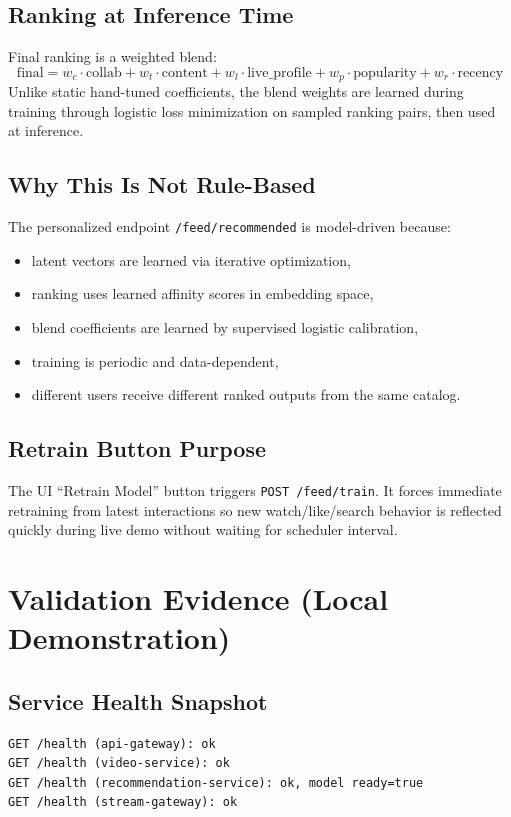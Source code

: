 \documentclass[11pt,a4paper]{article}
\begin{document}
\subsection{Ranking at Inference Time}
Final ranking is a weighted blend:
\[
\text{final} = w_c\cdot\text{collab} + w_t\cdot\text{content}
+ w_l\cdot\text{live\_profile}
+ w_p\cdot\text{popularity}
+ w_r\cdot\text{recency}
\]
Unlike static hand-tuned coefficients, the blend weights are learned during training through logistic loss minimization on sampled ranking pairs, then used at inference.

\subsection{Why This Is Not Rule-Based}
The personalized endpoint \texttt{/feed/recommended} is model-driven because:
\begin{itemize}[leftmargin=1.2em]
  \item latent vectors are learned via iterative optimization,
  \item ranking uses learned affinity scores in embedding space,
  \item blend coefficients are learned by supervised logistic calibration,
  \item training is periodic and data-dependent,
  \item different users receive different ranked outputs from the same catalog.
\end{itemize}

\subsection{Retrain Button Purpose}
The UI ``Retrain Model'' button triggers \texttt{POST /feed/train}. It forces immediate retraining from latest interactions so new watch/like/search behavior is reflected quickly during live demo without waiting for scheduler interval.

\section{Validation Evidence (Local Demonstration)}
\subsection{Service Health Snapshot}
\begin{lstlisting}[style=plain,caption={Health endpoint checks}]
GET /health (api-gateway): ok
GET /health (video-service): ok
GET /health (recommendation-service): ok, model ready=true
GET /health (stream-gateway): ok
\end{lstlisting}
\end{document}
